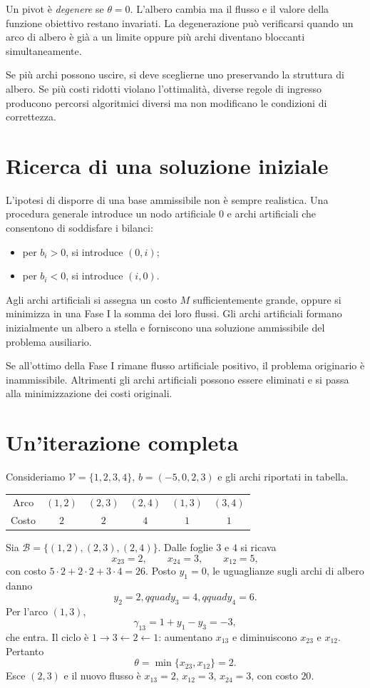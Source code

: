 \documentclass[11pt,a4paper]{article}
\newcommand{\V}{\mathcal{V}}
\newcommand{\Bset}{\mathcal{B}}
\begin{document}
Un pivot è \emph{degenere} se $\theta=0$. L'albero cambia ma il flusso e il valore della funzione obiettivo restano invariati. La degenerazione può verificarsi quando un arco di albero è già a un limite oppure più archi diventano bloccanti simultaneamente.

Se più archi possono uscire, si deve sceglierne uno preservando la struttura di albero. Se più costi ridotti violano l'ottimalità, diverse regole di ingresso producono percorsi algoritmici diversi ma non modificano le condizioni di correttezza.

\section{Ricerca di una soluzione iniziale}

L'ipotesi di disporre di una base ammissibile non è sempre realistica. Una procedura generale introduce un nodo artificiale $0$ e archi artificiali che consentono di soddisfare i bilanci:
\begin{itemize}
\item per $b_i>0$, si introduce $(0,i)$;
\item per $b_i<0$, si introduce $(i,0)$.
\end{itemize}
Agli archi artificiali si assegna un costo $M$ sufficientemente grande, oppure si minimizza in una Fase I la somma dei loro flussi. Gli archi artificiali formano inizialmente un albero a stella e forniscono una soluzione ammissibile del problema ausiliario.

Se all'ottimo della Fase I rimane flusso artificiale positivo, il problema originario è inammissibile. Altrimenti gli archi artificiali possono essere eliminati e si passa alla minimizzazione dei costi originali.

\section{Un'iterazione completa}

Consideriamo $\V=\{1,2,3,4\}$, $b=(-5,0,2,3)$ e gli archi riportati in tabella.
\begin{center}
\begin{tabular}{cccccc}
\toprule
Arco & $(1,2)$ & $(2,3)$ & $(2,4)$ & $(1,3)$ & $(3,4)$\\
Costo & $2$ & $2$ & $4$ & $1$ & $1$\\
\bottomrule
\end{tabular}
\end{center}
Sia $\Bset=\{(1,2),(2,3),(2,4)\}$. Dalle foglie $3$ e $4$ si ricava
\[
x_{23}=2,\qquad x_{24}=3,\qquad x_{12}=5,
\]
con costo $5\cdot2+2\cdot2+3\cdot4=26$. Posto $y_1=0$, le uguaglianze sugli archi di albero danno
\[
y_2=2,qquad y_3=4,qquad y_4=6.
\]
Per l'arco $(1,3)$,
\[
\gamma_{13}=1+y_1-y_3=-3,
\]
che entra. Il ciclo è $1\to3\leftarrow2\leftarrow1$: aumentano $x_{13}$ e diminuiscono $x_{23}$ e $x_{12}$. Pertanto
\[
\theta=\min\{x_{23},x_{12}\}=2.
\]
Esce $(2,3)$ e il nuovo flusso è $x_{13}=2$, $x_{12}=3$, $x_{24}=3$, con costo $20$.
\end{document}
